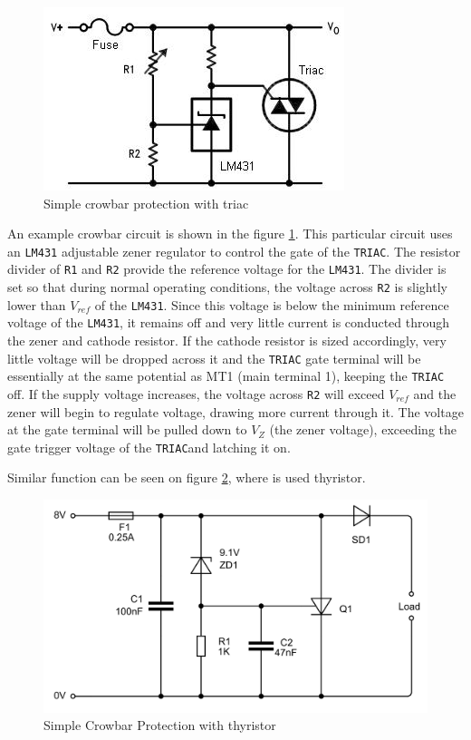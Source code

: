 \documentclass[journal]{IEEEtran}
\begin{document}
    \begin{figure}[!ht] %
      \centering
      \includegraphics[width=0.6\linewidth]{fig_HW003.jpg}
      \caption{Simple crowbar protection with triac}
      \label{HW002:fig003}
    \end{figure}
    
    An example crowbar circuit is shown in the figure \ref{HW002:fig003}. This particular circuit 
    uses an \texttt{LM431} adjustable zener regulator to control the gate of the \texttt{TRIAC}. 
    The resistor divider  of \texttt{R1} and \texttt{R2} provide the reference voltage for the 
    \texttt{LM431}. The divider is set so that during normal operating conditions, the voltage 
    across  \texttt{R2} is slightly lower than \(V_{ref}\) of the \texttt{LM431}. Since this 
    voltage is below the minimum reference voltage of the \texttt{LM431}, it remains off and very 
    little current is conducted through the zener and cathode resistor. If the cathode resistor is 
    sized accordingly, very little voltage will be dropped across it and the \texttt{TRIAC} gate 
    terminal will be essentially at the same potential as MT1 (main terminal 1), keeping the 
    \texttt{TRIAC} off. If the supply voltage increases, the voltage across \texttt{R2} will exceed 
    \(V_{ref}\) and the zener will begin to regulate voltage, drawing more current through it. The 
    voltage at the gate terminal will be pulled down to \(V_Z\) (the zener voltage), exceeding the 
    gate trigger voltage of the \texttt{TRIAC}and latching it on.
    
    Similar function can be seen on figure \ref{HW002:fig004}, where is used thyristor. 
    
    \begin{figure}[!ht] %
      \centering
      \includegraphics[width=0.6\linewidth]{fig_HW004.png}
      \caption{Simple Crowbar Protection with thyristor}
      \label{HW002:fig004}
    \end{figure}
    
\end{document}

